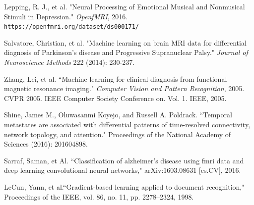 \documentclass{article}[12pt]
\begin{document}
   \newpage
   \begin{thebibliography}{9}
   	
   	Lepping, R. J., et al. "Neural Processing of Emotional Musical and Nonmusical Stimuli in Depression." \textit{OpenfMRI}, 2016.\\
   	\texttt{https://openfmri.org/dataset/ds000171/}
   	
   	Salvatore, Christian, et al. "Machine learning on brain MRI data for differential diagnosis of Parkinson's disease and Progressive Supranuclear Palsy." \textit{Journal of Neuroscience Methods} 222 (2014): 230-237.
   	
   	Zhang, Lei, et al. ``Machine learning for clinical diagnosis from functional magnetic resonance imaging." \textit{Computer Vision and Pattern Recognition}, 2005. CVPR 2005. IEEE Computer Society Conference on. Vol. 1. IEEE, 2005.
   	
   	Shine, James M., Oluwasanmi Koyejo, and Russell A. Poldrack. ``Temporal metastates are associated with differential patterns of time-resolved connectivity, network topology, and attention." Proceedings of the National Academy of Sciences (2016): 201604898.
   
   Sarraf, Saman, et Al. ``Classification  of alzheimer’s disease using fmri data and deep learning convolutional neural networks," arXiv:1603.08631 [cs.CV], 2016.
   	
   	LeCun, Yann, et al.``Gradient-based learning applied to document recognition," Proceedings of the IEEE, vol. 86, no. 11, pp. 2278–2324, 1998. 
   	\end{thebibliography}
   
   
   
   
   
\end{document}
